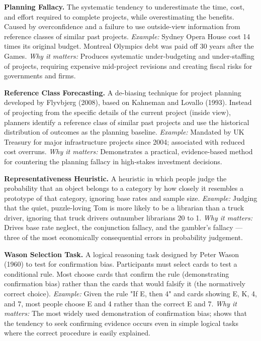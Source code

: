 \documentclass[12pt, letterpaper]{article}
\begin{document}
\textbf{Planning Fallacy.} The systematic tendency to underestimate the time, cost, and effort required to complete projects, while overestimating the benefits. Caused by overconfidence and a failure to use outside-view information from reference classes of similar past projects. \textit{Example:} Sydney Opera House cost 14 times its original budget. Montreal Olympics debt was paid off 30 years after the Games. \textit{Why it matters:} Produces systematic under-budgeting and under-staffing of projects, requiring expensive mid-project revisions and creating fiscal risks for governments and firms.

\textbf{Reference Class Forecasting.} A de-biasing technique for project planning developed by Flyvbjerg (2008), based on Kahneman and Lovallo (1993). Instead of projecting from the specific details of the current project (inside view), planners identify a reference class of similar past projects and use the historical distribution of outcomes as the planning baseline. \textit{Example:} Mandated by UK Treasury for major infrastructure projects since 2004; associated with reduced cost overruns. \textit{Why it matters:} Demonstrates a practical, evidence-based method for countering the planning fallacy in high-stakes investment decisions.

\textbf{Representativeness Heuristic.} A heuristic in which people judge the probability that an object belongs to a category by how closely it resembles a prototype of that category, ignoring base rates and sample size. \textit{Example:} Judging that the quiet, puzzle-loving Tom is more likely to be a librarian than a truck driver, ignoring that truck drivers outnumber librarians 20 to 1. \textit{Why it matters:} Drives base rate neglect, the conjunction fallacy, and the gambler's fallacy --- three of the most economically consequential errors in probability judgement.

\textbf{Wason Selection Task.} A logical reasoning task designed by Peter Wason (1960) to test for confirmation bias. Participants must select cards to test a conditional rule. Most choose cards that confirm the rule (demonstrating confirmation bias) rather than the cards that would falsify it (the normatively correct choice). \textit{Example:} Given the rule "If E, then 4" and cards showing E, K, 4, and 7, most people choose E and 4 rather than the correct E and 7. \textit{Why it matters:} The most widely used demonstration of confirmation bias; shows that the tendency to seek confirming evidence occurs even in simple logical tasks where the correct procedure is easily explained.
\end{document}
